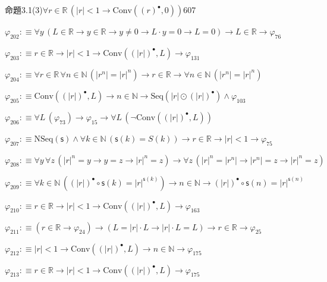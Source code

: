 \begin{fullproof}{命題3.1(3)}{$\forall r \in \mathbb{R}\,(\lvert r \rvert < 1 \to \mathrm{Conv}({(r)^{\bullet}},0))$}{607}
\begin{abbrevlist}
\item $\varphi_{202} :\equiv \forall y\,(L \in \mathbb{R} \to y \in \mathbb{R} \to y \neq 0 \to L \cdot y = 0 \to L = 0) \to L \in \mathbb{R} \to \varphi_{76}$
\item $\varphi_{203} :\equiv r \in \mathbb{R} \to \lvert r \rvert < 1 \to \mathrm{Conv}({(\lvert r \rvert)^{\bullet}},L) \to \varphi_{131}$
\item $\varphi_{204} :\equiv \forall r \in \mathbb{R}\,\forall n \in \mathbb{N}\,(\lvert {{r}^{n}} \rvert = {{\lvert r \rvert}^{n}}) \to r \in \mathbb{R} \to \forall n \in \mathbb{N}\,(\lvert {{r}^{n}} \rvert = {{\lvert r \rvert}^{n}})$
\item $\varphi_{205} :\equiv \mathrm{Conv}({(\lvert r \rvert)^{\bullet}},L) \to n \in \mathbb{N} \to \mathrm{Seq}(\lvert r \rvert \odot {(\lvert r \rvert)^{\bullet}}) \land \varphi_{103}$
\item $\varphi_{206} :\equiv \forall L\,(\varphi_{73}) \to \varphi_{15} \to \forall L\,(\neg \mathrm{Conv}({(\lvert r \rvert)^{\bullet}},L))$
\item $\varphi_{207} :\equiv \mathrm{NSeq}(\mathsf{s}) \land \forall k \in \mathbb{N}\,(\mathsf{s}(k) = S(k)) \to r \in \mathbb{R} \to \lvert r \rvert < 1 \to \varphi_{75}$
\item $\varphi_{208} :\equiv \forall y\,\forall z\,({{\lvert r \rvert}^{n}} = y \to y = z \to {{\lvert r \rvert}^{n}} = z) \to \forall z\,({{\lvert r \rvert}^{n}} = \lvert {{r}^{n}} \rvert \to \lvert {{r}^{n}} \rvert = z \to {{\lvert r \rvert}^{n}} = z)$
\item $\varphi_{209} :\equiv \forall k \in \mathbb{N}\,({(\lvert r \rvert)^{\bullet}} \circ \mathsf{s}(k) = {{\lvert r \rvert}^{\mathsf{s}(k)}}) \to n \in \mathbb{N} \to {(\lvert r \rvert)^{\bullet}} \circ \mathsf{s}(n) = {{\lvert r \rvert}^{\mathsf{s}(n)}}$
\item $\varphi_{210} :\equiv r \in \mathbb{R} \to \lvert r \rvert < 1 \to \mathrm{Conv}({(\lvert r \rvert)^{\bullet}},L) \to \varphi_{163}$
\item $\varphi_{211} :\equiv (r \in \mathbb{R} \to \varphi_{24}) \to (L = \lvert r \rvert \cdot L \to \lvert r \rvert \cdot L = L) \to r \in \mathbb{R} \to \varphi_{25}$
\item $\varphi_{212} :\equiv \lvert r \rvert < 1 \to \mathrm{Conv}({(\lvert r \rvert)^{\bullet}},L) \to n \in \mathbb{N} \to \varphi_{175}$
\item $\varphi_{213} :\equiv r \in \mathbb{R} \to \lvert r \rvert < 1 \to \mathrm{Conv}({(\lvert r \rvert)^{\bullet}},L) \to \varphi_{175}$

\end{abbrevlist}
\end{fullproof}
